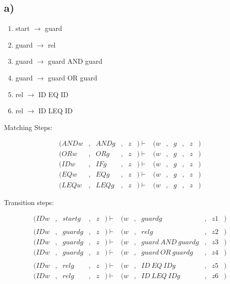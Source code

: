 \subsection*{a)}

\begin{enumerate}
\item start $\rightarrow$ guard
\item guard $\rightarrow$ rel
\item guard $\rightarrow$ guard AND guard
\item guard $\rightarrow$ guard OR guard
\item rel $\rightarrow$ ID EQ ID
\item rel $\rightarrow$ ID LEQ ID
\end{enumerate}

Matching Steps:

\begin{equation*}
  \begin{aligned}
          & (ANDw&, &ANDg&, &z &) \vdash   & (w&,  &g&, &z &) \\
          & (ORw&, &ORg&, &z &) \vdash   & (w&,  &g&, &z &) \\
          & (IDw&, &IFg&, &z &) \vdash   & (w&,  &g&, &z &) \\
          & (EQw&, &EQg&, &z &) \vdash   & (w&,  &g&, &z &) \\
          & (LEQw&, &LEQg&, &z &) \vdash   & (w&,  &g&, &z &)
\end{aligned}
\end{equation*}

Transition steps:

\begin{equation*}
  \begin{aligned}
          & (IDw&, &startg&, &z &) \vdash   & (w&,  &guardg&, &z1 &) \\
          & \\
          & (IDw&, &guardg&, &z &) \vdash   & (w&,  &relg&, &z2 &) \\
          & (IDw&, &guardg&, &z &) \vdash   & (w&,  &guard\:AND\:guardg&, &z3 &) \\
          & (IDw&, &guardg&, &z &) \vdash   & (w&,  &guard\:OR\:guardg&, &z4 &) \\
          & \\
          & (IDw&, &relg&, &z &) \vdash   & (w&,  &ID\:EQ\:IDg&, &z5 &) \\
          & (IDw&, &relg&, &z &) \vdash   & (w&,  &ID\:LEQ\:IDg&, &z6 &)
\end{aligned}
\end{equation*}

